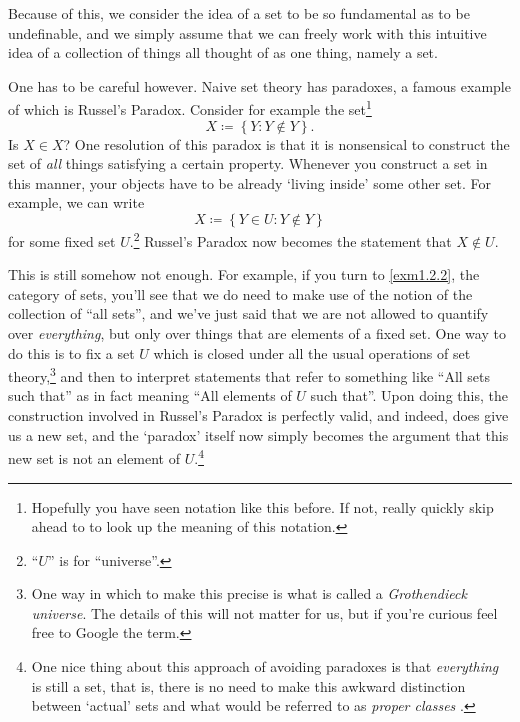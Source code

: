 Because of this, we consider the idea of a set to be so fundamental as to be undefinable, and we simply assume that we can freely work with this intuitive idea of a collection of things all thought of as one thing, namely a set.

One has to be careful however.  Naive set theory has paradoxes, a famous example of which is Russel's Paradox.  Consider for example the set\footnote{Hopefully you have seen notation like this before.  If not, really quickly skip ahead to  to look up the meaning of this notation.}
\begin{equation}\label{A.1.1}
X\coloneqq \left\{ Y:Y\notin Y\right\} .
\end{equation}
Is $X\in X$?  One resolution of this paradox is that it is nonsensical to construct the set of \emph{all} things satisfying a certain property.  Whenever you construct a set in this manner, your objects have to be already `living inside' some other set.  For example, we can write
\begin{equation}
X\coloneqq \left\{ Y\in U:Y\notin Y\right\}
\end{equation}
for some fixed set $U$.\footnote{``$U$'' is for ``universe''.}  Russel's Paradox now becomes the statement that $X\notin U$.

This is still somehow not enough.  For example, if you turn to \cref{exm1.2.2}, the category of sets, you'll see that we do need to make use of the notion of the collection of ``all sets'', and we've just said that we are not allowed to quantify over \emph{everything}, but only over things that are elements of a fixed set.  One way to do this is to fix a set $U$ which is closed under all the usual operations of set theory,\footnote{One way in which to make this precise is what is called a \emph{Grothendieck universe}.  The details of this will not matter for us, but if you're curious feel free to Google the term.} and then to interpret statements that refer to something like ``All sets such that\textellipsis '' as in fact meaning ``All elements of $U$ such that\textellipsis ''.  Upon doing this, the construction involved in Russel's Paradox is perfectly valid, and indeed, does give us a new set, and the `paradox' itself now simply becomes the argument that this new set is not an element of $U$.\footnote{One nice thing about this approach of avoiding paradoxes is that \emph{everything} is still a set, that is, there is no need to make this awkward distinction between `actual' sets and what would be referred to as \emph{proper classes}
.}

